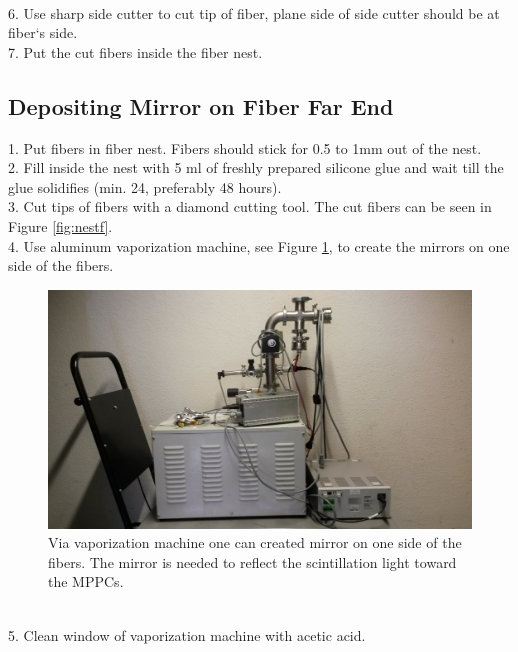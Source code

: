 \documentclass[a4paper]{article}\linespread{1.4}
\begin{document}
\\6.	Use sharp side cutter to cut tip of fiber, plane side of side cutter should be at fiber`s side.
\\7.	Put the cut fibers inside the fiber nest.

\subsection{Depositing Mirror on Fiber Far End}
1.	Put fibers in fiber nest. Fibers should stick for 0.5 to 1mm out of the nest.
\\2.	Fill inside the nest with 5 ml of freshly prepared silicone glue and wait till the glue solidifies (min. 24, preferably 48 hours).
\\3.	Cut tips of fibers with a diamond cutting tool. The cut fibers can be seen in Figure \ref{fig:nestf}.
\\4.	Use aluminum vaporization machine, see Figure \ref{fig:vap}, to create the mirrors on one side of the fibers.
\begin{figure}[h!] \hspace*{-0.5cm} \includegraphics[width=135mm,scale=2.0]{vappaint.jpg} \caption{Via vaporization machine one can created mirror on one side of the fibers. The mirror is needed to reflect the scintillation light toward the MPPCs.} \label{fig:vap}\end{figure}
\\5.	Clean window of vaporization machine with acetic acid.
\end{document}
